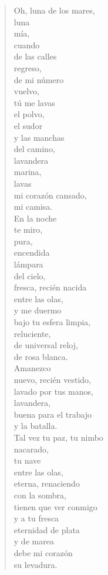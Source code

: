 \documentclass[12pt]{article}
\begin{document}
\begin{verse}
Oh, luna de los mares,\\
luna\\
mía,\\
cuando\\
de las calles\\
regreso,\\
de mi número\\
vuelvo,\\
tú me lavas\\
el polvo,\\
el sudor\\
y las manchas\\
del camino,\\
lavandera\\
marina,\\
lavas\\
mi corazón cansado,\\
mi camisa.\\
En la noche\\
te miro,\\
pura,\\
encendida\\
lámpara\\
del cielo,\\
fresca, recién nacida\\
entre las olas,\\
y me duermo\\
bajo tu esfera limpia,\\
reluciente,\\
de universal reloj,\\
de rosa blanca.\\
Amanezco\\
nuevo, recién vestido,\\
lavado por tus manos,\\
lavandera,\\
buena para el trabajo\\
y la batalla.\\
Tal vez tu paz, tu nimbo\\
nacarado,\\
tu nave\\
entre las olas,\\
eterna, renaciendo\\
con la sombra,\\
tienen que ver conmigo\\
y a tu fresca\\
eternidad de plata\\
y de marea\\
debe mi corazón\\
su levadura.  

\end{verse}
\end{document}
